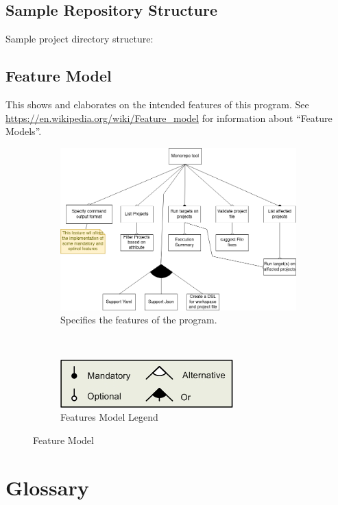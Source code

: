 \documentclass[11pt]{article}
\begin{document}
\clearpage

\subsection{Sample Repository Structure}

Sample project directory structure:


\clearpage
\subsection{Feature Model}

This shows and elaborates on the intended features of this program. See
\url{https://en.wikipedia.org/wiki/Feature_model} for information about
``Feature Models''.

\begin{figure}[htbp]
  \centering
  \begin{subfigure}{\linewidth}
    \includegraphics[width=\linewidth]{diags/feature.png}
    \caption{\label{fig:feature}Specifies the features of the program.}
  \end{subfigure}
  \\[5ex]
  \begin{subfigure}{\linewidth}
    \centering
    \includegraphics[width=0.3\linewidth]{diags/features_legend.jpg}
    \caption{Features Model Legend}
  \end{subfigure}
  \caption{Feature Model}
\end{figure}

\clearpage
\section{Glossary}
\printglossary[title=\normalsize\vspace*{-1.5\baselineskip}, toctitle=]
\end{document}
